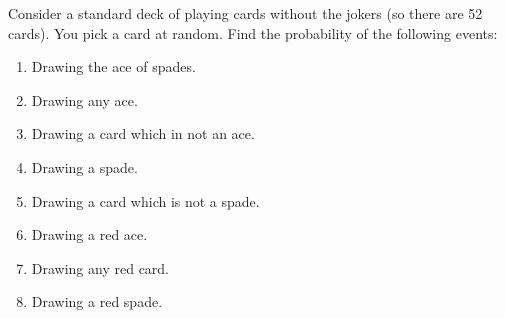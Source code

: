 \begin{problem}
 Consider a standard deck of playing cards without the jokers (so there are 52 cards).  You pick a card at random.  Find the probability of the following events:
\begin{enumerate}
 \item Drawing the ace of spades.
\item Drawing any ace.
\item Drawing a card which in not an ace.
\item Drawing a spade.
\item Drawing a card which is not a spade.
\item Drawing a red ace.
\item Drawing any red card.
\item Drawing a red spade.
\end{enumerate}

\end{problem}

